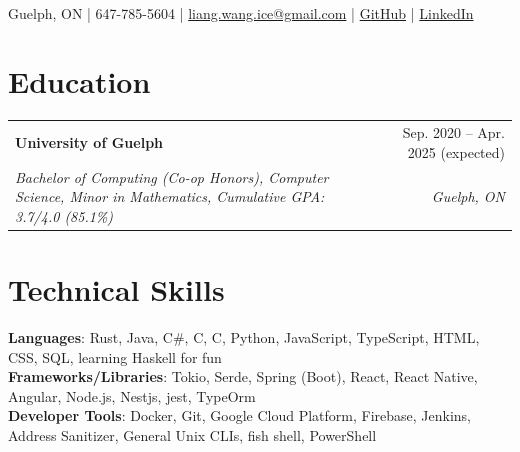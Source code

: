 \documentclass[letterpaper, 10pt]{report}
\makeatletter
\newcommand{\resumeSubheading}[4]{
    \begin{tabular*}{\textwidth}[t]{l@{\extracolsep{\fill}}r}
        \textbf{#1}       & #2                \\
        \textit{\small#3} & \textit{\small#4} \\
    \end{tabular*}\vspace{-0.7em}
}
\newcommand{\cxx}{C\nolinebreak\hspace{-.05em}\raisebox{0.03ex}{\bf +}\nolinebreak\hspace{-.05em}\raisebox{.03ex}{\bf +}}
\makeatother
\begin{document}
    \begin{center}
        \textbf{\HUGE\color{Pink}{Liang Wang}} \\ \vspace{1.5em}
        \small Guelph, ON |
        647-785-5604 |
        \href{mailto:liang.wang.ice@gmail.com}{{liang.wang.ice@gmail.com}}  |
        \href{https://github.com/Internal-Compiler-Error}{{GitHub}} |
        \href{https://www.linkedin.com/in/liang-wang-225607174/}{{LinkedIn}} \\
    \end{center}

    \section{Education}
    \resumeSubheading{University of Guelph}{Sep. 2020 -- Apr. 2025 (expected)}{Bachelor of Computing (Co-op Honors), Computer Science, Minor in Mathematics, Cumulative GPA: 3.7/4.0 (85.1\%)}{Guelph, ON}


    \section{Technical Skills}
    \vspace{0.1em}
    \begin{itemize}[leftmargin=0em, label={}]
        \small{\item{
            \textbf{Languages}{: Rust, Java, C\#, \cxx, C, Python, JavaScript, TypeScript, HTML, CSS, SQL, learning Haskell for fun} \\
            \textbf{Frameworks/Libraries}{: Tokio, Serde, Spring (Boot), React, React Native, Angular, Node.js, Nestjs, jest, TypeOrm} \\
            \textbf{Developer Tools}{: Docker, Git, Google Cloud Platform, Firebase, Jenkins, Address Sanitizer, General Unix CLIs, fish shell, PowerShell} \\
        }}
    \end{itemize}


\end{document}
